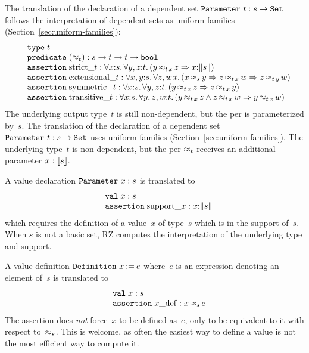 \iflong
The translation of the declaration of a dependent set
$\iParameter{t}{s \to \iSet}$ follows the interpretation of dependent
sets as uniform families (Section~\ref{sec:uniform-families}):
%
\[
\begin{array}{ll}  
  & \otyspec{t} \\
  & \opropspec{({\approx_{t}})}{\oarrow{s}{\oarrow{t}{\oarrow{t}{\oProp}}}}\\
  & \oassertion{\mathrm{strict}\_{t}}{
    \oforall{x}{s}{
      \oforall{y,z}{t}{
        (\oimply{\oper{\oapp{t}{x}}{y}{z}}{\ototal{x}{s}})
      }
    }
  } \\
  & \oassertion{\mathrm{extensional}\_{t}}{
    \oforall{x,y}{s}{
      \oforall{z,w}{t}{
        (\oimply{\oper{s}{x}{y}}{
          \oimply{\oper{\oapp{t}{x}}{z}{w}}{\oper{\oapp{t}{y}}{z}{w}}
        })
      }
    }
  } \\
  & \oassertion{\mathrm{symmetric}\_{t}}{
    \oforall{x}{s}{
      \oforall{y,z}{t}{(\oimply{\oper{\oapp{t}{x}}{y}{z}}{\oper{\oapp{t}{x}}{z}{y}})}
    }
  }
  \\
  & \oassertion{\mathrm{transitive}\_{t}}{
    \oforall{x}{s}{
      \oforall{y,z,w}{t}{(
        \oimply{
          \oper{\oapp{t}{x}}{y}{z} \land \oper{\oapp{t}{x}}{z}{w}
        }{\oper{\oapp{t}{x}}{y}{w}}
        )}
    }
  }
\end{array}
\]
%
The underlying output type~$t$ is still non-dependent, but the per is
parameterized by~$s$.
\else %
The translation of the declaration of a dependent set
$\iParameter{t}{s \to \iSet}$ uses uniform families (Section~\ref{sec:uniform-families}). The
underlying type~$t$ is non-dependent, but the per $\per_t$ receives an
additional parameter $x : \values{s}$.
\fi %

A value declaration $\iParameter{x}{s}$ is translated to
%
\[
\begin{array}{ll}
  & \ovalspec{x}{s} \\
  & \oassertion{\mathrm{support}\_x}{\ototal{x}{s}}
\end{array}
\]
%
which requires the definition of a value~$x$ of type~$s$ which is in
the support of~$s$.
\iflong
When $s$ is not a basic set, RZ computes the
interpretation of the underlying type and support.
\fi

A value definition $\iDefinition{x}{e}$ where~$e$ is an expression
denoting an element of~$s$ is translated to
%
\[
\begin{array}{ll}
  & \ovalspec{x}{s} \\
  & \oassertion{x\_\mathrm{def}}{\oper{s}{x}{e}}
\end{array}
\]
%
The assertion does \emph{not} force~$x$ to be defined as~$e$, only to
be equivalent to it with respect to~$\per_s$. This is welcome, as
often the easiest way to define a value is not the most efficient
way to compute it.

